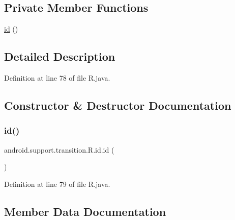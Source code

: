 \subsection*{Private Member Functions}
\begin{DoxyCompactItemize}
\item 
\mbox{\hyperlink{classandroid_1_1support_1_1transition_1_1_r_1_1id_aeafcccb69bf3c6c6b0a44d4e7544abaf}{id}} ()
\end{DoxyCompactItemize}


\subsection{Detailed Description}


Definition at line 78 of file R.\+java.



\subsection{Constructor \& Destructor Documentation}
\mbox{\label{classandroid_1_1support_1_1transition_1_1_r_1_1id_aeafcccb69bf3c6c6b0a44d4e7544abaf}} 
\subsubsection{\texorpdfstring{id()}{id()}}
{\footnotesize\ttfamily android.\+support.\+transition.\+R.\+id.\+id (\begin{DoxyParamCaption}{ }\end{DoxyParamCaption})\hspace{0.3cm}{\ttfamily [private]}}



Definition at line 79 of file R.\+java.


\begin{DoxyCode}{0}

\end{DoxyCode}


\subsection{Member Data Documentation}
\mbox{\label{classandroid_1_1support_1_1transition_1_1_r_1_1id_a5dee43fd7c62be47631539c1e8a4a24b}} 
